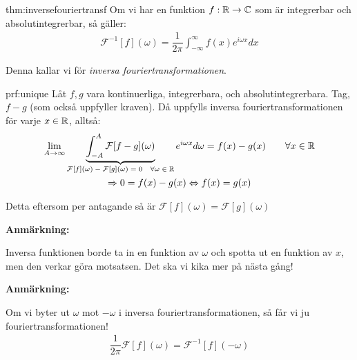 \par\bigskip
\begin{theo}{thm:inversefouriertransf}
  Om vi har en funktion $f:\mathbb{R}\to\mathbb{C}$ som är integrerbar och absolutintegrerbar, så gäller:
  \begin{equation*}
    \begin{gathered}
      \mathcal{F}^{-1}[f](\omega) = \dfrac{1}{2\pi}\int_{-\infty}^{\infty}f(x)e^{i\omega x}dx
    \end{gathered}
  \end{equation*}
  \par\bigskip
  \noindent Denna kallar vi för \textit{inversa fouriertransformationen}.
\end{theo}
\par\bigskip
\begin{prf}{prf:unique}
  Låt $f,g$ vara kontinuerliga, integrerbara, och absolutintegrerbara. Tag, $f-g$ (som också uppfyller kraven). Då uppfylls inversa fouriertransformationen för varje $x\in\mathbb{R}$, alltså:
  \begin{equation*}
    \begin{gathered}
      \lim_{A\to\infty}\underbrace{\int_{-A}^{A}\mathcal{F}[f-g](\omega)}_{\text{$\mathcal{F}[f](\omega)-\mathcal{F}[g](\omega) = 0\quad\forall \omega\in\mathbb{R}$}}e^{i\omega x}d\omega = f(x)-g(x)\qquad\forall x\in\mathbb{R}\\
      \Rightarrow 0 = f(x)-g(x)\Leftrightarrow f(x) = g(x)
    \end{gathered}
  \end{equation*}
  \par\bigskip
  \noindent Detta eftersom per antagande så är $\mathcal{F}[f](\omega) = \mathcal{F}[g](\omega)$
\end{prf}
\par\bigskip
\noindent\textbf{Anmärkning:}\par
\noindent Inversa funktionen borde ta in en funktion av $\omega$ och spotta ut en funktion av $x$, men den verkar göra motsatsen. Det ska vi kika mer på nästa gång!
\par\bigskip
\noindent\textbf{Anmärkning:}\par
\noindent Om vi byter ut $\omega$ mot $-\omega$ i inversa fouriertransformationen, så får vi ju fouriertransformationen!
\begin{equation*}
  \begin{gathered}
    \dfrac{1}{2\pi}\mathcal{F}[f](\omega) = \mathcal{F}^{-1}[f](-\omega)
  \end{gathered}
\end{equation*}
